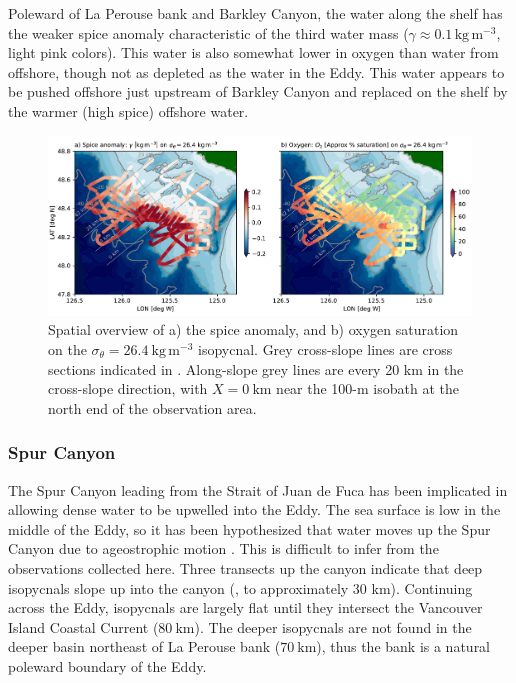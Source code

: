 \documentclass[draft]{agujournal2019}
\newcommand*{\Eddy}{{\sc Eddy}}
\begin{document}
Poleward of La Perouse bank and Barkley Canyon, the water along the shelf has the weaker spice anomaly characteristic of the third water mass ($\gamma \approx 0.1\,\mathrm{kg\,m^{-3}}$, light pink colors).  This water is also somewhat lower in oxygen than water from offshore, though not as depleted as the water in the \Eddy.  This water appears to be pushed offshore just upstream of Barkley Canyon and replaced on the shelf by the warmer (high spice) offshore water.

\begin{figure}[htbp]
  \begin{center}
    \includegraphics[width=6.2in]{SpiceO2264}
    \caption{Spatial overview of a) the spice anomaly, and b) oxygen saturation on the $\sigma_{\theta} = 26.4\ \mathrm{kg\,m^{-3}}$ isopycnal.  Grey cross-slope lines are cross sections indicated in .  Along-slope grey lines are every 20 km in the cross-slope direction, with $X=0\ \mathrm{km}$ near the 100-m isobath at the north end of the observation area.
   \label{fig:SpiceO2264}
    }
  \end{center}
\end{figure}

\subsubsection{Spur Canyon}

The Spur Canyon leading from the Strait of Juan de Fuca has been implicated in allowing dense water to be upwelled into the \Eddy.  The sea surface is low in the middle of the \Eddy, so it has been hypothesized that water moves up the Spur Canyon due to ageostrophic motion \cite{weaverhsieh87,freelanddenman82}.  This is difficult to infer from the observations collected here.  Three transects up the canyon indicate that deep isopycnals slope up into the canyon (, to approximately 30 km).  Continuing across the \Eddy, isopycnals are largely flat until they intersect the Vancouver Island Coastal Current ($80\ \mathrm{km}$).  The deeper isopycnals are not found in the deeper basin northeast of La Perouse bank ($70\ \mathrm{km}$),  thus the bank is a natural poleward boundary of the \Eddy.
\end{document}
